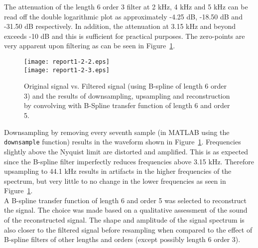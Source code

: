 The attenuation of the length 6 order 3 filter at 2 kHz, 4 kHz and 5 kHz can be read off the double logarithmic plot as approximately -4.25 dB, -18.50 dB and -31.50 dB respectively. In addition, the attenuation at 3.15 kHz and beyond exceeds -10 dB and this is sufficient for practical purposes. The zero-points are very apparent upon filtering as can be seen in Figure~\ref{fig:FilteredSpokenSentence}.\\

\begin{figure}[H]
\center
\texttt{[image: report1-2-2.eps]}\\
\texttt{[image: report1-2-3.eps]}
\caption{Original signal vs. Filtered signal (using B-spline of length 6 order 3) and the results of downsampling, upsampling and reconstruction by convolving with B-Spline transfer function of length 6 and order 5.}
\label{fig:FilteredSpokenSentence}
\end{figure}

Downsampling by removing every seventh sample (in MATLAB using the \texttt{downsample} function) results in the waveform shown in Figure~\ref{fig:FilteredSpokenSentence}. Frequencies slightly above the Nyquist limit are distorted and amplified. This is as expected since the B-spline filter imperfectly reduces frequencies above 3.15 kHz. Therefore upsampling to 44.1 kHz results in artifacts in the higher frequencies of the spectrum, but very little to no change in the lower frequencies as seen in Figure~\ref{fig:FilteredSpokenSentence}. \\

A B-spline transfer function of length 6 and order 5 was selected to reconstruct the signal. The choice was made based on a qualitative assessment of the sound of the reconstructed signal. The shape and amplitude of the signal spectrum is also closer to the filtered signal before resampling when compared to the effect of B-spline filters of other lengths and orders (except possibly length 6 order 3).

